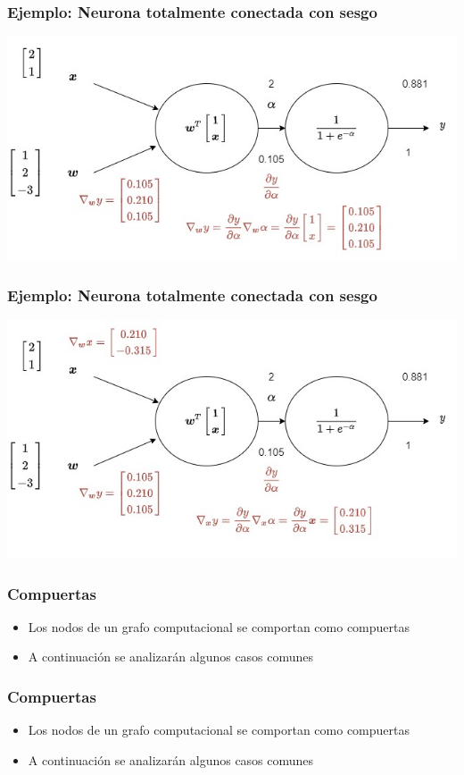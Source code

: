 \documentclass{beamer}
\begin{document}
\begin{frame}
\frametitle{Ejemplo: Neurona totalmente conectada con sesgo}
\includegraphics[scale=0.4]{im22}
\end{frame}
\begin{frame}
\frametitle{Ejemplo: Neurona totalmente conectada con sesgo}
\includegraphics[scale=0.4]{im23}
\end{frame}
\begin{frame}
\frametitle{Compuertas}
\begin{itemize}
\item Los nodos de un grafo computacional se comportan como compuertas
\item A continuación se analizarán algunos casos comunes
\end{itemize}
\end{frame}
\begin{frame}
\frametitle{Compuertas}
\begin{itemize}
\item Los nodos de un grafo computacional se comportan como compuertas
\item A continuación se analizarán algunos casos comunes
\end{itemize}
\end{frame}
\end{document}

